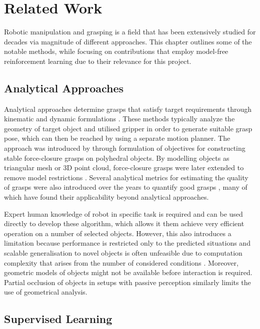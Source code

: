 \chapter{Related Work}

Robotic manipulation and grasping is a field that has been extensively studied for decades via magnitude of different approaches. This chapter outlines some of the notable methods, while focusing on contributions that employ model-free reinforcement learning due to their relevance for this project.


\section{Analytical Approaches}

Analytical approaches determine grasps that satisfy target requirements through kinematic and dynamic formulations \cite{sahbani_overview_2012}. These methods typically analyze the geometry of target object and utilised gripper in order to generate suitable grasp pose, which can then be reached by using a separate motion planner. The approach was introduced by \citet{nguyen_constructing_1987} through formulation of objectives for constructing stable force-closure grasps on polyhedral objects. By modelling objects as triangular mesh or 3D point cloud, force-closure grasps were later extended to remove model restrictions \cite{yun-hui_liu_complete_2004}. Several analytical metrics for estimating the quality of grasps were also introduced over the years to quantify good grasps \cite{roa_grasp_2015}, many of which have found their applicability beyond analytical approaches.

Expert human knowledge of robot in specific task is required and can be used directly to develop these algorithm, which allows it them achieve very efficient operation on a number of selected objects. However, this also introduces a limitation because performance is restricted only to the predicted situations and scalable generalisation to novel objects is often unfeasible due to computation complexity that arises from the number of considered conditions \cite{sahbani_overview_2012}. Moreover, geometric models of objects might not be available before interaction is required. Partial occlusion of objects in setups with passive perception similarly limits the use of geometrical analysis.


\section{Supervised Learning}

